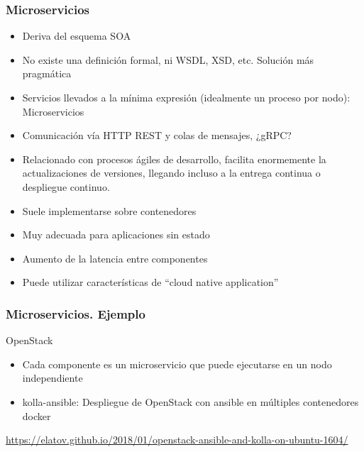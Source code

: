 \documentclass[aspectratio=169]{beamer}
\begin{document}
\begin{frame}
  \frametitle{Microservicios}
  \begin{itemize}
  \item Deriva del esquema SOA
  \item No existe una definición formal, ni WSDL, XSD, etc. Solución más pragmática
  \item Servicios llevados a la mínima expresión (idealmente un proceso por nodo): Microservicios
  \item Comunicación vía HTTP REST y colas de mensajes, ¿gRPC?
  \item Relacionado con procesos ágiles de desarrollo, facilita enormemente la actualizaciones de
    versiones, llegando incluso a la entrega continua o despliegue continuo.
  \item Suele implementarse sobre contenedores
  \item Muy adecuada para aplicaciones sin estado
  \item Aumento de la latencia entre componentes
  \item Puede utilizar características de “cloud native application”
  \end{itemize}
\end{frame}

\begin{frame}
  \frametitle{Microservicios. Ejemplo}
  OpenStack
  \begin{itemize}
  \item Cada componente es un microservicio que puede ejecutarse en un nodo independiente
  \item kolla-ansible: Despliegue de OpenStack con ansible en múltiples contenedores docker
  \end{itemize}
  \url{https://elatov.github.io/2018/01/openstack-ansible-and-kolla-on-ubuntu-1604/}
\end{frame}
\end{document}
